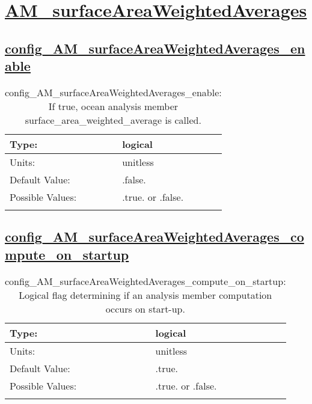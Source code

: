 \section[AM\_surfaceAreaWeightedAverages]{\hyperref[sec:nm_tab_AM_surfaceAreaWeightedAverages]{AM\_surfaceAreaWeightedAverages}}
\label{sec:nm_sec_AM_surfaceAreaWeightedAverages}
\subsection[config\_AM\_surfaceAreaWeightedAverages\_enable]{\hyperref[sec:nm_tab_AM_surfaceAreaWeightedAverages]{config\_AM\_surfaceAreaWeightedAverages\_enable}}
\label{subsec:nm_sec_config_AM_surfaceAreaWeightedAverages_enable}
\begin{center}
\begin{longtable}{| p{2.0in} || p{4.0in} |}
    \hline
    Type: & logical \\
    \hline
    Units: & \si{unitless} \\
    \hline
    Default Value: & .false. \\
    \hline
    Possible Values: & .true. or .false. \\
    \hline
    \caption{config\_AM\_surfaceAreaWeightedAverages\_enable: If true, ocean analysis member surface\_area\_weighted\_average is called.}
\end{longtable}
\end{center}
\subsection[config\_AM\_surfaceAreaWeightedAverages\_compute\_on\_startup]{\hyperref[sec:nm_tab_AM_surfaceAreaWeightedAverages]{config\_AM\_surfaceAreaWeightedAverages\_compute\_on\_startup}}
\label{subsec:nm_sec_config_AM_surfaceAreaWeightedAverages_compute_on_startup}
\begin{center}
\begin{longtable}{| p{2.0in} || p{4.0in} |}
    \hline
    Type: & logical \\
    \hline
    Units: & \si{unitless} \\
    \hline
    Default Value: & .true. \\
    \hline
    Possible Values: & .true. or .false. \\
    \hline
    \caption{config\_AM\_surfaceAreaWeightedAverages\_compute\_on\_startup: Logical flag determining if an analysis member computation occurs on start-up.}
\end{longtable}
\end{center}
